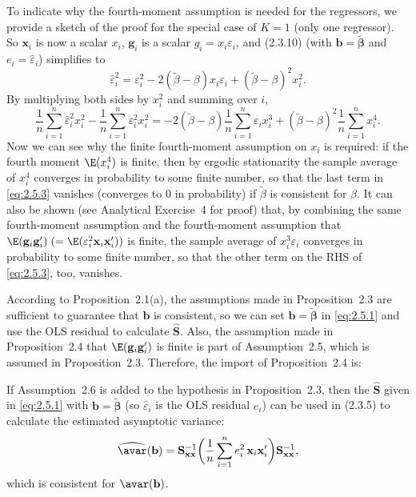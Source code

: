 To indicate why the fourth-moment assumption is needed for the regressors, we provide
a sketch of the proof for the special case of $K = 1$ (only one regressor).  So
$\mathbf{x}_i$ is now a scalar $x_i$, $\mathbf{g}_i$ is a scalar $g_i = x_i \varepsilon_i$,
and (2.3.10) (with $\mathbf{b} = \widetilde{\bm{\beta}}$ and $e_i = \hat{\varepsilon}_i$)
simplifies to
\begin{equation}
  \hat{\varepsilon}_i^2 = \varepsilon_i^2 - 2(\widetilde{\beta} - \beta) x_i \varepsilon_i
    + (\widetilde{\beta} - \beta)^2 x_i^2.
  \label{eq:2.5.2}
\end{equation}
By multiplying both sides by $x_i^2$ and summing over $i$,
\begin{equation}
  \frac{1}{n} \sum_{i=1}^{n} \hat{\varepsilon}_i^2 x_i^2
    - \frac{1}{n} \sum_{i=1}^{n} \varepsilon_i^2 x_i^2
    = -2(\widetilde{\beta} - \beta) \frac{1}{n} \sum_{i=1}^{n} \varepsilon_i x_i^3
    + (\widetilde{\beta} - \beta)^2 \frac{1}{n} \sum_{i=1}^{n} x_i^4.
  \label{eq:2.5.3}
\end{equation}
Now we can see why the finite fourth-moment assumption on $x_i$ is required: if the
fourth moment $\E(x_i^4)$ is finite, then by ergodic stationarity the sample average of
$x_i^4$ converges in probability to some finite number, so that the last term in
\eqref{eq:2.5.3} vanishes (converges to 0 in probability) if $\widetilde{\beta}$ is
consistent for $\beta$.  It can also be shown (see Analytical Exercise~4 for proof) that,
by combining the same fourth-moment assumption and the fourth-moment assumption that
$\E(\mathbf{g}_i \mathbf{g}_i') \;(= \E(\varepsilon_i^2 \mathbf{x}_i \mathbf{x}_i'))$ is
finite, the sample average of $x_i^3 \varepsilon_i$ converges in probability to some
finite number, so that the other term on the RHS of \eqref{eq:2.5.3}, too, vanishes.

According to Proposition~2.1(a), the assumptions made in Proposition~2.3 are sufficient
to guarantee that $\mathbf{b}$ is consistent, so we can set
$\mathbf{b} = \widetilde{\bm{\beta}}$ in \eqref{eq:2.5.1} and use the OLS residual to
calculate $\widehat{\mathbf{S}}$.  Also, the assumption made in Proposition~2.4 that
$\E(\mathbf{g}_i \mathbf{g}_i')$ is finite is part of Assumption~2.5, which is assumed in
Proposition~2.3.  Therefore, the import of Proposition~2.4 is:

\medskip
\noindent
If Assumption~2.6 is added to the hypothesis in Proposition~2.3, then the
$\widehat{\mathbf{S}}$ given in \eqref{eq:2.5.1} with
$\mathbf{b} = \widetilde{\bm{\beta}}$ (so $\hat{\varepsilon}_i$ is the OLS residual $e_i$)
can be used in (2.3.5) to calculate the estimated asymptotic variance:
\begin{equation}
  \widehat{\avar}(\mathbf{b}) = \mathbf{S}_{\mathbf{xx}}^{-1}
    \biggl(\frac{1}{n} \sum_{i=1}^{n} e_i^2\, \mathbf{x}_i \mathbf{x}_i'\biggr)
    \mathbf{S}_{\mathbf{xx}}^{-1},
  \label{eq:2.5.4}
\end{equation}
which is consistent for $\avar(\mathbf{b})$.

